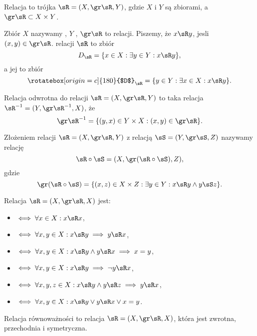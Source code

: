 \begin{definition}
    Relacja to trójka $\sR = (X, \gr\sR, Y)$, gdzie $X$ i $Y$ są zbiorami, a $\gr \sR \subset X \times Y$.
\end{definition}

Zbiór $X$ nazywamy , $Y$ , $\gr \sR$ to  relacji. Piszemy, że $x \sR y$, jesli $(x, y) \in \gr\sR$.  relacji $\sR$ to zbiór
$$ D_\sR = \{x \in X : \exists y \in Y : x \sR y\}, $$
a jej  to zbiór
$$ \rotatebox[origin=c]{180}{$D$}_\sR = \{y \in Y : \exists x \in X : x \sR y\}. $$

\begin{definition}
    Relacja odwrotna do relacji $\sR = (X, \gr\sR, Y)$ to taka relacja $\sR^{-1} = (Y, \gr\sR^{-1}, X)$, że
    $$ \gr \sR^{-1} = \{(y, x) \in Y \times X : (x, y) \in \gr\sR\}. $$
\end{definition}

\begin{definition}
    Złożeniem relacji $\sR = (X, \gr\sR, Y)$ z relacją $\sS = (Y, \gr\sS, Z)$ nazywamy relację
    $$ \sR \circ \sS = (X, \gr(\sR \circ \sS), Z), $$
    gdzie
    $$ \gr(\sR \circ \sS) = \{(x, z) \in X \times Z : \exists y \in Y : x \sR y \wedge y \sS z\}. $$
\end{definition}

\begin{definition}
    Relacja $\sR = (X, \gr\sR, X)$ jest:
    \begin{itemize}[--]
        \item {} $\iff \forall x\in X : x \sR x$,
        \item {} $\iff \forall x, y \in X : x \sR y \implies y \sR x$,
        \item {} $\iff \forall x, y \in X : x \sR y \wedge y \sR x \implies x = y$,
        \item {} $\iff \forall x, y \in X : x \sR y \implies \neg y \sR x$,
        \item {} $\iff \forall x, y, z \in X : x \sR y \wedge y \sR z \implies y \sR x$,
        \item {} $\iff \forall x, y \in X : x \sR y \vee y \sR x \vee x = y$.
    \end{itemize}
\end{definition}

\begin{definition}
    Relacja równoważności to relacja $\sR = (X, \gr\sR, X)$, która jest zwrotna, przechodnia i symetryczna.
\end{definition}

